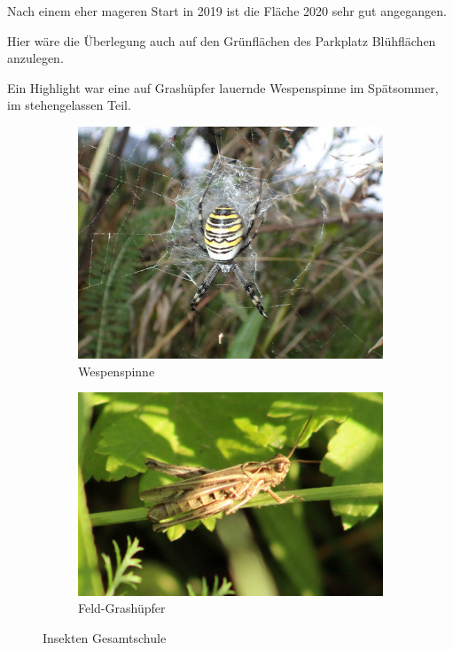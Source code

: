 \documentclass[10pt]{article}
\begin{document}
Nach einem eher mageren Start in 2019 ist die Fläche 2020 sehr gut angegangen.

Hier wäre die Überlegung auch auf den Grünflächen des Parkplatz Blühflächen anzulegen.

Ein Highlight war eine auf Grashüpfer lauernde Wespenspinne im Spätsommer, im stehengelassen Teil.


\begin{figure}[h!]
  \centering
  \begin{subfigure}[b]{0.34\linewidth}
    \includegraphics[width=\linewidth]{img/gesamtschule/wespenspinne.jpg}
    \caption{Wespenspinne}
  \end{subfigure}
  \begin{subfigure}[b]{0.38\linewidth}
    \includegraphics[width=\linewidth]{img/gesamtschule/grashuepfer.jpg}
    \caption{Feld-Grashüpfer}
  \end{subfigure}
  \caption{Insekten Gesamtschule}
\end{figure}
\end{document}
